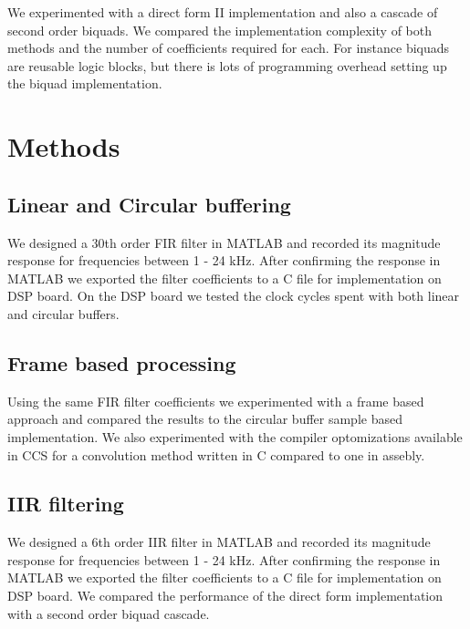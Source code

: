 \documentclass{article}
\begin{document}
We experimented with a direct form II implementation and also a cascade of second order biquads.
We compared the implementation complexity of both methods and the number of coefficients required for each.
For instance biquads are reusable logic blocks, but there is lots of programming overhead setting up the biquad implementation.



\section{Methods}

\subsection{Linear and Circular buffering}

We designed a 30th order FIR filter in MATLAB and recorded its magnitude response for frequencies between 1 - 24 kHz.
After confirming the response in MATLAB we exported the filter coefficients to a C file for implementation on DSP board.
On the DSP board we tested the clock cycles spent with both linear and circular buffers.

\subsection{Frame based processing}

Using the same FIR filter coefficients we experimented with a frame based approach and compared the results to the circular buffer sample based implementation.
We also experimented with the compiler optomizations available in CCS for a convolution method written in C compared to one in assebly.

\subsection{IIR filtering}

We designed a 6th order IIR filter in MATLAB and recorded its magnitude response for frequencies between 1 - 24 kHz.
After confirming the response in MATLAB we exported the filter coefficients to a C file for implementation on DSP board.
We compared the performance of the direct form implementation with a second order biquad cascade.
 
\end{document}
